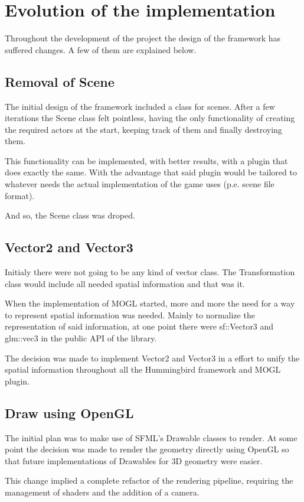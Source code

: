 \section{Evolution of the implementation}

Throughout the development of the project the design of the framework has suffered changes. 
A few of them are explained below.

\subsection{Removal of Scene}
The initial design of the framework included a class for scenes. After a few iterations 
the Scene class felt pointless, having the only functionality of creating the required 
actors at the start, keeping track of them and finally destroying them.

This functionality can be implemented, with better results, with a plugin that does 
exactly the same. With the advantage that said plugin would be tailored to whatever 
needs the actual implementation of the game uses (p.e. scene file format).

And so, the Scene class was droped.

\subsection{Vector2 and Vector3}
Initialy there were not going to be any kind of vector class. The Transformation class 
would include all needed spatial information and that was it.

When the implementation of MOGL started, more and more the need for a way to represent 
spatial information was needed. Mainly to normalize the representation of said information, 
at one point there were sf::Vector3 and glm::vec3 in the public API of the library.

The decision was made to implement Vector2 and Vector3 in a effort to unify the spatial 
information throughout all the Hummingbird framework and MOGL plugin.

\subsection{Draw using OpenGL}
The initial plan was to make use of SFML's Drawable classes to render. At some point 
the decision was made to render the geometry directly using OpenGL so that future implementations 
of Drawables for 3D geometry were easier.

This change implied a complete refactor of the rendering pipeline, requiring the 
management of shaders and the addition of a camera.
